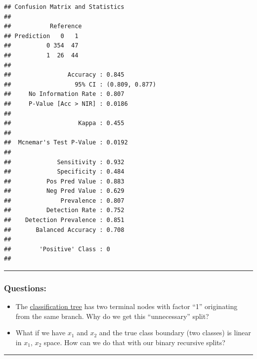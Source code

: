 \documentclass[]{article}
\providecommand{\tightlist}{%
  \setlength{\itemsep}{0pt}\setlength{\parskip}{0pt}}
\begin{document}
\begin{verbatim}
## Confusion Matrix and Statistics
## 
##           Reference
## Prediction   0   1
##          0 354  47
##          1  26  44
##                                         
##                Accuracy : 0.845         
##                  95% CI : (0.809, 0.877)
##     No Information Rate : 0.807         
##     P-Value [Acc > NIR] : 0.0186        
##                                         
##                   Kappa : 0.455         
##                                         
##  Mcnemar's Test P-Value : 0.0192        
##                                         
##             Sensitivity : 0.932         
##             Specificity : 0.484         
##          Pos Pred Value : 0.883         
##          Neg Pred Value : 0.629         
##              Prevalence : 0.807         
##          Detection Rate : 0.752         
##    Detection Prevalence : 0.851         
##       Balanced Accuracy : 0.708         
##                                         
##        'Positive' Class : 0             
## 
\end{verbatim}

\normalsize

\begin{center}\rule{0.5\linewidth}{\linethickness}\end{center}

\hypertarget{questions}{%
\subsubsection{Questions:}\label{questions}}

\begin{itemize}
\tightlist
\item
  The \protect\hyperlink{classtree2}{classification tree} has two
  terminal nodes with factor ``1'' originating from the same branch. Why
  do we get this ``unnecessary'' split?
\item
  What if we have \(x_1\) and \(x_2\) and the true class boundary (two
  classes) is linear in \(x_1\), \(x_2\) space. How can we do that with
  our binary recursive splits?
\end{itemize}

\begin{center}\rule{0.5\linewidth}{\linethickness}\end{center}
\end{document}
